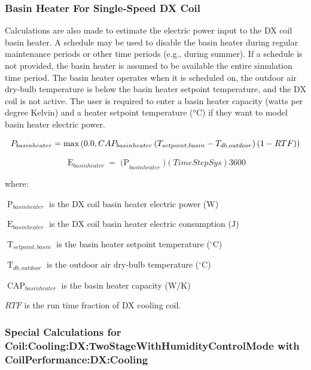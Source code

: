 \subsubsection{Basin Heater For Single-Speed DX Coil}\label{basin-heater-for-single-speed-dx-coil}

Calculations are also made to estimate the electric power input to the DX coil basin heater. A schedule may be used to disable the basin heater during regular maintenance periods or other time periods (e.g., during summer). If a schedule is not provided, the basin heater is assumed to be available the entire simulation time period. The basin heater operates when it is scheduled on, the outdoor air dry-bulb temperature is below the basin heater setpoint temperature, and the DX coil is not active. The user is required to enter a basin heater capacity (watts per degree Kelvin) and a heater setpoint temperature (\(^{o}\)C) if they want to model basin heater electric power.

\begin{equation}
 P_{basinheater} = \max\left(0.0, CAP_{basinheater} \left(T_{setpoint,basin} - T_{db,outdoor} \right)\left(1 - RTF\right)\right)
\end{equation}

\begin{equation}
  \mathop E\nolimits_{basinheater} = \mathop {(P}\nolimits_{basinheater} )(TimeStepSys)3600
\end{equation}

where:

\(\mathop P\nolimits_{basinheater}\) is the DX coil basin heater electric power (W)

\(\mathop E\nolimits_{basinheater}\) is the DX coil basin heater electric consumption (J)

\(\mathop T\nolimits_{setpoint,basin}\) is the basin heater setpoint temperature (\(^{\circ}\)C)

\(\mathop T\nolimits_{db,outdoor}\) is the outdoor air dry-bulb temperature (\(^{\circ}\)C)

\(\mathop {CAP}\nolimits_{basinheater}\) is the basin heater capacity (W/K)

\(RTF\) is the run time fraction of DX cooling coil.

\subsubsection{Special Calculations for Coil:Cooling:DX:TwoStageWithHumidityControlMode with CoilPerformance:DX:Cooling}\label{special-calculations-for-coilcoolingdxtwostagewithhumiditycontrolmode-with-coilperformancedxcooling}

